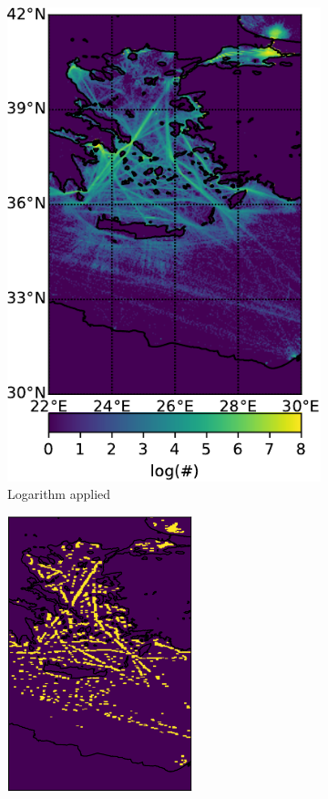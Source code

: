 \documentclass{article}
\begin{document}
\begin{figure}[h] 
  \begin{subfigure}[b]{0.5\linewidth}
    \centering
    \includegraphics[width=0.7\linewidth]{AGEAN_DCRON-crop.pdf} 
    \caption{Logarithm applied} 
    \label{fig7:a} 
    \vspace{4ex}
  \end{subfigure}%
  \begin{subfigure}[b]{0.5\linewidth}
    \centering
    \includegraphics[width=0.59\textwidth]{AGEAN_DCRON_opened-crop.pdf} 

\end{subfigure}
\end{figure}
\end{document}
